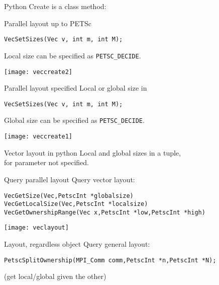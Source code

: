 \lstset{language=Python}  
\begin{python}
\begin{numberedframe}{Python}
  Create is a class method:

\end{numberedframe}
\end{python}
\lstset{language=C}

\begin{numberedframe}{Parallel layout up to PETSc}
\begin{lstlisting}
VecSetSizes(Vec v, int m, int M);
\end{lstlisting}
Local size can be specified as \lstinline{PETSC_DECIDE}.

\texttt{[image: veccreate2]}
\end{numberedframe}

\begin{numberedframe}{Parallel layout specified}
Local or global size in
\begin{lstlisting}
VecSetSizes(Vec v, int m, int M);
\end{lstlisting}
Global size can be specified as \lstinline{PETSC_DECIDE}.

\texttt{[image: veccreate1]}
\end{numberedframe}

\lstset{language=Python}
\begin{python}
\begin{numberedframe}{Vector layout in python}
  Local and global sizes in a tuple,\\
   for parameter not specified.
  
\end{numberedframe}
\end{python}
\lstset{language=C}

\begin{details}
\begin{numberedframe}{Query parallel layout}
Query vector layout:
\begin{lstlisting}
VecGetSize(Vec,PetscInt *globalsize)
VecGetLocalSize(Vec,PetscInt *localsize)
VecGetOwnershipRange(Vec x,PetscInt *low,PetscInt *high)
\end{lstlisting}
\texttt{[image: veclayout]}
\end{numberedframe}

\begin{numberedframe}{Layout, regardless object}
Query general layout:
\begin{lstlisting}
PetscSplitOwnership(MPI_Comm comm,PetscInt *n,PetscInt *N);
\end{lstlisting}
(get local/global given the other)
\end{numberedframe}
\end{details}

